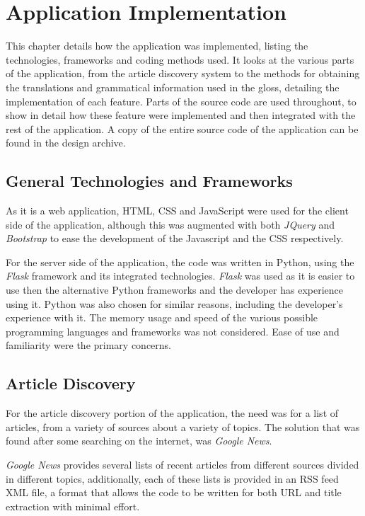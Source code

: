 \chapter{Application Implementation}

This chapter details how the application was implemented, listing the technologies, frameworks and coding methods used. It looks at the various parts of the application, from the article discovery system to the methods for obtaining the translations and grammatical information used in the gloss, detailing the implementation of each feature. Parts of the source code are used throughout, to show in detail how these feature were implemented and then integrated with the rest of the application. A copy of the entire source code of the application can be found in the design archive.

\section{General Technologies and Frameworks}

As it is a web application, HTML, CSS and JavaScript were used for the client side of the application, although this was augmented with both \textit{JQuery} and \textit{Bootstrap} to ease the development of the Javascript and the CSS respectively. 

For the server side of the application, the code was written in Python, using the \textit{Flask} framework and its integrated technologies. \textit{Flask} was used as it is easier to use then the alternative Python frameworks and the developer has experience using it. Python was also chosen for similar reasons, including the developer's experience with it. The memory usage and speed of the various possible programming languages and frameworks was not considered. Ease of use and familiarity were the primary concerns. 

\section{Article Discovery}

For the article discovery portion of the application, the need was for a list of articles, from a variety of sources about a variety of topics. The solution that was found after some searching on the internet, was \textit{Google News}.

\textit{Google News} provides several lists of recent articles from different sources divided in different topics, additionally, each of these lists is provided in an RSS feed XML file, a format that allows the code to be written for both URL and title extraction with minimal effort.

